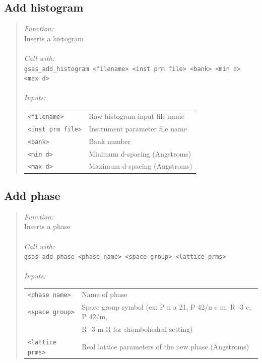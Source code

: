 \documentclass{article}
\begin{document}
\subsection{Add histogram}
\begin{quote}
\textit{Function:}\\
Inserts a histogram \\ \\
\textit{Call with:}\\
\texttt{gsas\_add\_histogram <filename> <inst prm file> <bank> <min d> <max d>} \\ \\
\textit{Inputs:}\\
\begin{tabular}[t]{l l}
\texttt{<filename>} & Raw histogram input file name\\
\texttt{<inst prm file>} & Instrument parameter file name\\
\texttt{<bank>} & Bank number\\
\texttt{<min d>} & Minimum d-spacing (Angstroms)\\
\texttt{<max d>} & Maximum d-spacing (Angstroms)\\
\end{tabular}
\end{quote}

\subsection{Add phase}
\begin{quote}
\textit{Function:}\\ 
Inserts a phase \\ \\
\textit{Call with:}\\
\texttt{gsas\_add\_phase <phase name> <space group> <lattice prms>}\\ \\
\textit{Inputs:}\\
\begin{tabular}[t]{l l}
\texttt{<phase name>} & Name of phase\\
\texttt{<space group>} & Space group symbol (ex: P n a 21, P 42/n c m, R -3 c, P 42/m,\\ 
& R -3 m R for rhombohedral setting)\\
\texttt{<lattice prms>} & Real lattice parameters of the new phase (Angstroms)\\
\end{tabular}
\end{quote}
\end{document}
